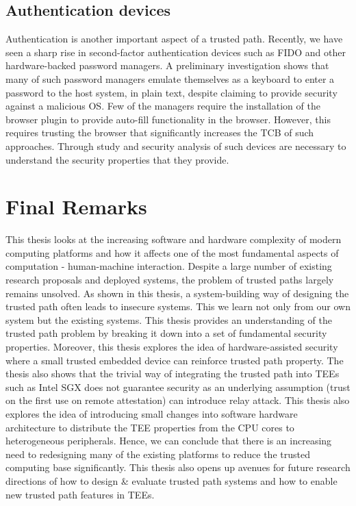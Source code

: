 \subsection{Authentication devices} Authentication is another important aspect of a trusted path. Recently, we have seen a sharp rise in second-factor authentication devices such as FIDO and other hardware-backed password managers. A preliminary investigation shows that many of such password managers emulate themselves as a keyboard to enter a password to the host system, in plain text, despite claiming to provide security against a malicious OS. Few of the managers require the installation of the browser plugin to provide auto-fill functionality in the browser. However, this requires trusting the browser that significantly increases the TCB of such approaches. Through study and security analysis of such devices are necessary to understand the security properties that they provide.



\section{Final Remarks}

This thesis looks at the increasing software and hardware complexity of modern computing platforms and how it affects one of the most fundamental aspects of computation - human-machine interaction. Despite a large number of existing research proposals and deployed systems, the problem of trusted paths largely remains unsolved. As shown in this thesis, a system-building way of designing the trusted path often leads to insecure systems. This we learn not only from our own system but the existing systems. This thesis provides an understanding of the trusted path problem by breaking it down into a set of fundamental security properties.
Moreover, this thesis explores the idea of hardware-assisted security where a small trusted embedded device can reinforce trusted path property. The thesis also shows that the trivial way of integrating the trusted path into TEEs such as Intel SGX does not guarantee security as an underlying assumption (trust on the first use on remote attestation) can introduce relay attack. This thesis also explores the idea of introducing small changes into software hardware architecture to distribute the TEE properties from the CPU cores to heterogeneous peripherals. Hence, we can conclude that there is an increasing need to redesigning many of the existing platforms to reduce the trusted computing base significantly. This thesis also opens up avenues for future research directions of how to design \& evaluate trusted path systems and how to enable new trusted path features in TEEs.

